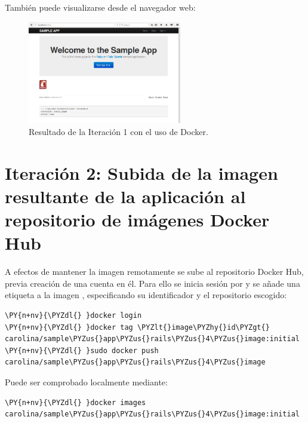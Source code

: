 También puede visualizarse desde el navegador web:
\begin{figure}[H]
\centering
\includegraphics[width=0.6\textwidth]{images/figures/resultado1.png}
\caption{Resultado de la Iteración 1 con el uso de Docker. \label{fig:resultado1}}
\end{figure}

\section[Iteración 2: Subida de la imagen a Docker Hub]{Iteración 2: Subida de la imagen resultante de la aplicación al repositorio de imágenes Docker Hub}

A efectos de mantener la imagen remotamente se sube al repositorio Docker Hub, previa creación de una cuenta en él. Para ello se inicia sesión por y se añade una etiqueta a la imagen , especificando su identificador y el repositorio escogido:

\begin{framed_shaded}
\begin{Verbatim}[fontsize=\relsize{-2.5},fontseries=b,commandchars=\\\{\}]
\PY{n+nv}{\PYZdl{} }docker login
\PY{n+nv}{\PYZdl{} }docker tag \PYZlt{}image\PYZhy{}id\PYZgt{} carolina/sample\PYZus{}app\PYZus{}rails\PYZus{}4\PYZus{}image:initial
\PY{n+nv}{\PYZdl{} }sudo docker push carolina/sample\PYZus{}app\PYZus{}rails\PYZus{}4\PYZus{}image
\end{Verbatim}
\end{framed_shaded}

Puede ser comprobado localmente mediante:

\begin{framed_shaded}
\begin{Verbatim}[fontsize=\relsize{-2.5},fontseries=b,commandchars=\\\{\}]
\PY{n+nv}{\PYZdl{} }docker images carolina/sample\PYZus{}app\PYZus{}rails\PYZus{}4\PYZus{}image:initial
\end{Verbatim}
\end{framed_shaded}

